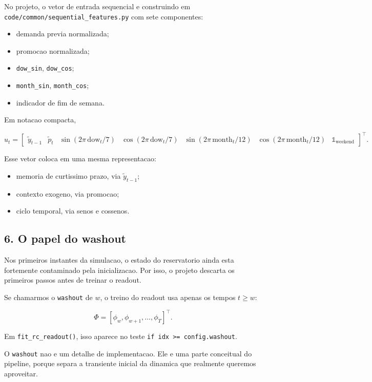 \documentclass[12pt]{article}
\providecommand{\tightlist}{%
          \setlength{\itemsep}{0pt}\setlength{\parskip}{0pt}}
\begin{document}
No projeto, o vetor de entrada sequencial e construindo em \texttt{code/common/sequential\_features.py} com sete componentes:

\begin{itemize}
\tightlist
\item
  demanda previa normalizada;
\item
  promocao normalizada;
\item
  \texttt{dow\_sin}, \texttt{dow\_cos};
\item
  \texttt{month\_sin}, \texttt{month\_cos};
\item
  indicador de fim de semana.
\end{itemize}

Em notacao compacta,

\[
u_t =
\begin{bmatrix}
\widetilde{y}_{t-1} &
\widetilde{p}_t &
\sin(2\pi \, \mathrm{dow}_t / 7) &
\cos(2\pi \, \mathrm{dow}_t / 7) &
\sin(2\pi \, \mathrm{month}_t / 12) &
\cos(2\pi \, \mathrm{month}_t / 12) &
\mathbb{1}_{\mathrm{weekend}}
\end{bmatrix}^\top.
\]

Esse vetor coloca em uma mesma representacao:

\begin{itemize}
\tightlist
\item
  memoria de curtissimo prazo, via \(\widetilde{y}_{t-1}\);
\item
  contexto exogeno, via promocao;
\item
  ciclo temporal, via senos e cossenos.
\end{itemize}

\subsection{6. O papel do washout}\label{6-o-papel-do-washout}

Nos primeiros instantes da simulacao, o estado do reservatorio ainda esta fortemente contaminado pela inicializacao. Por isso, o projeto descarta os primeiros passos antes de treinar o readout.

Se chamarmos o \texttt{washout} de \(w\), o treino do readout usa apenas os tempos \(t \ge w\):

\[
\Phi = [\phi_w, \phi_{w+1}, \dots, \phi_T]^\top.
\]

Em \texttt{fit\_rc\_readout()}, isso aparece no teste \texttt{if\ idx\ \textgreater{}=\ config.washout}.

O \texttt{washout} nao e um detalhe de implementacao. Ele e uma parte conceitual do pipeline, porque separa a transiente inicial da dinamica que realmente queremos aproveitar.
\end{document}

